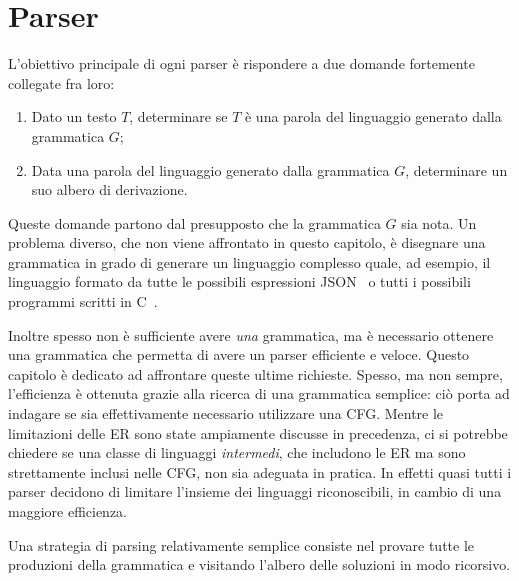 \chapter{Parser}\label{cha:parser}

L'obiettivo principale di ogni parser è rispondere a due domande fortemente collegate fra loro:
\begin{enumerate}
\item Dato un testo $T$, determinare se $T$ è una parola del linguaggio generato dalla grammatica $G$;
\item Data una parola del linguaggio generato dalla grammatica $G$, determinare un suo albero di derivazione.
\end{enumerate}

Queste domande partono dal presupposto che la grammatica $G$ sia nota.
Un problema diverso, che non viene affrontato in questo capitolo, è disegnare una grammatica in grado di generare un
linguaggio complesso quale, ad esempio, il linguaggio formato da tutte le possibili espressioni JSON~\cite{ECMA:JSON} o tutti i possibili
programmi scritti in C~\cite{gustedt:modern-c}.

Inoltre spesso non è sufficiente avere \emph{una} grammatica, ma è necessario ottenere una grammatica che permetta di
avere un parser efficiente e veloce.
Questo capitolo è dedicato ad affrontare queste ultime richieste.
Spesso, ma non sempre, l'efficienza è ottenuta grazie alla ricerca di una grammatica semplice: ciò porta ad indagare se
sia effettivamente necessario utilizzare una CFG.
Mentre le limitazioni delle ER sono state ampiamente discusse in precedenza, ci si potrebbe chiedere se una classe di
linguaggi \emph{intermedi}, che includono le ER ma sono strettamente inclusi nelle CFG, non sia adeguata in pratica.
In effetti quasi tutti i parser decidono di limitare l'insieme dei linguaggi riconoscibili, in cambio di una maggiore efficienza.



Una strategia di parsing relativamente semplice consiste nel provare tutte le
produzioni della grammatica e visitando l'albero delle soluzioni in modo ricorsivo.

